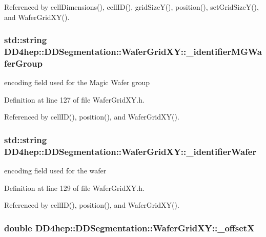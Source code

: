 Referenced by cellDimensions(), cellID(), gridSizeY(), position(), setGridSizeY(), and WaferGridXY().\hypertarget{class_d_d4hep_1_1_d_d_segmentation_1_1_wafer_grid_x_y_ae4552eda8798fc3fb8c4bd155a7ee6eb}{
\subsubsection[{\_\-identifierMGWaferGroup}]{\setlength{\rightskip}{0pt plus 5cm}std::string {\bf DD4hep::DDSegmentation::WaferGridXY::\_\-identifierMGWaferGroup}}}
\label{class_d_d4hep_1_1_d_d_segmentation_1_1_wafer_grid_x_y_ae4552eda8798fc3fb8c4bd155a7ee6eb}


encoding field used for the Magic Wafer group 

Definition at line 127 of file WaferGridXY.h.

Referenced by cellID(), position(), and WaferGridXY().\hypertarget{class_d_d4hep_1_1_d_d_segmentation_1_1_wafer_grid_x_y_aec0c4ade6e6eed2c87623f7e675b5fd1}{
\subsubsection[{\_\-identifierWafer}]{\setlength{\rightskip}{0pt plus 5cm}std::string {\bf DD4hep::DDSegmentation::WaferGridXY::\_\-identifierWafer}}}
\label{class_d_d4hep_1_1_d_d_segmentation_1_1_wafer_grid_x_y_aec0c4ade6e6eed2c87623f7e675b5fd1}


encoding field used for the wafer 

Definition at line 129 of file WaferGridXY.h.

Referenced by cellID(), position(), and WaferGridXY().\hypertarget{class_d_d4hep_1_1_d_d_segmentation_1_1_wafer_grid_x_y_a4cfbedf40751f8d064a0e4c071a04d66}{
\subsubsection[{\_\-offsetX}]{\setlength{\rightskip}{0pt plus 5cm}double {\bf DD4hep::DDSegmentation::WaferGridXY::\_\-offsetX}}}
\label{class_d_d4hep_1_1_d_d_segmentation_1_1_wafer_grid_x_y_a4cfbedf40751f8d064a0e4c071a04d66}


